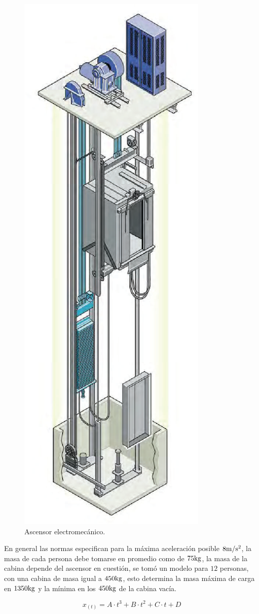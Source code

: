 \begin{figure}
\begin{center}
\includegraphics[width=0.35 \linewidth, keepaspectratio=true]{img/diagrams/elevator.png} %
\caption{\label{fig:fig_elevator} \footnotesize{Ascensor electromecánico.}}
\end{center}
\end{figure}

En general las normas especifican para la máxima aceleración posible $8 \si[per-mode=symbol]{\meter\per\second\squared}$, la masa de cada persona debe tomarse en promedio como de $75 \si[per-mode=symbol]{\kilogram}$, la masa de la cabina depende del ascensor en cuestión, se tomó un modelo para $12$ personas, con una cabina de masa igual a $450 \si[per-mode=symbol]{\kilogram}$, esto determina la masa máxima de carga en $1350 \si[per-mode=symbol]{\kilogram}$ y la mínima en los $450 \si[per-mode=symbol]{\kilogram}$ de la cabina vacía.


\begin{equation}
x_{(t)} = A \cdot t^{3} + B \cdot t^{2} + C \cdot t + D
\end{equation}

